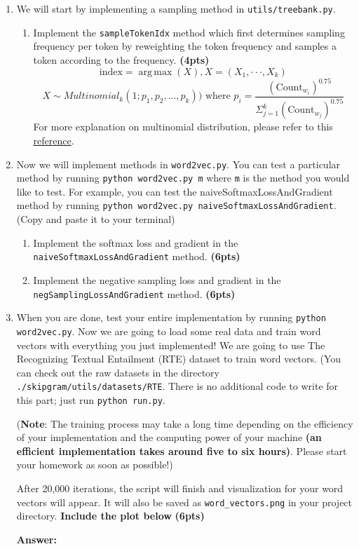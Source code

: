\documentclass{assignment format}
\DeclareMathOperator*{\argmax}{arg\,max}
\newenvironment{answer}{
    {\bf Answer:} \begingroup\color{red}
}{\endgroup}%
\begin{document}
\begin{enumerate}[label=(\alph*)]
    \item We will start by implementing a sampling method in \texttt{utils/treebank.py}. 
        \begin{enumerate}[label=(\roman*)]
            \item Implement the \texttt{sampleTokenIdx} method which first determines sampling frequency per token by reweighting the token frequency and samples a token according to the frequency. \textbf{(4pts)}
            $$\text{index} = \argmax(X), X = (X_1, · · · , X_k)$$
            $$X \sim Multinomial_k(1; p_1, p_2, ..., p_k)) \text{ where } p_i = \frac{(\text{Count}_{w_i})^{0.75}}{\Sigma_{j=1}^{k}{(\text{Count}_{w_j})^{0.75}}}$$
            For more explanation on multinomial distribution, please refer to this \href{http://faculty.washington.edu/yenchic/20A_stat512/Lec7_Multinomial.pdf}{reference}. 
        \end{enumerate}
    \item Now we will implement methods in \texttt{word2vec.py}. You can test a particular method by running \texttt{python word2vec.py m} where \texttt{m} is the method you would like to test. For example, you can test the naiveSoftmaxLossAndGradient method by running \texttt{python word2vec.py naiveSoftmaxLossAndGradient}. (Copy and paste it to your terminal)
        \begin{enumerate}[label=(\roman*)]
        \item Implement the softmax loss and gradient in the \texttt{naiveSoftmaxLossAndGradient} method. \textbf{(6pts)}
        \item Implement the negative sampling loss and gradient in the \texttt{negSamplingLossAndGradient} method. \textbf{(6pts)}
    \end{enumerate}
    \item When you are done, test your entire implementation by running \texttt{python word2vec.py}. Now we are going to load some real data and train word vectors with everything you just implemented! We are going to use The Recognizing Textual Entailment (RTE) dataset to train word vectors. (You can check out the raw datasets in the directory \texttt{./skipgram/utils/datasets/RTE}. There is no additional code to write for this part; just run \texttt{python run.py}.

    (\textbf{Note}: The training process may take a long time depending on the efficiency of your implementation and the computing power of your machine \textbf{(an efficient implementation takes around five to six hours)}. Please start your homework as soon as possible!)

    After 20,000 iterations, the script will finish and visualization for your word vectors will appear. It will also be saved as \texttt{word\_vectors.png} in your project directory. \textbf{Include the plot below} \textbf{(6pts)}
    
    \begin{answer}

    \end{answer}
\end{enumerate}
\end{document}

